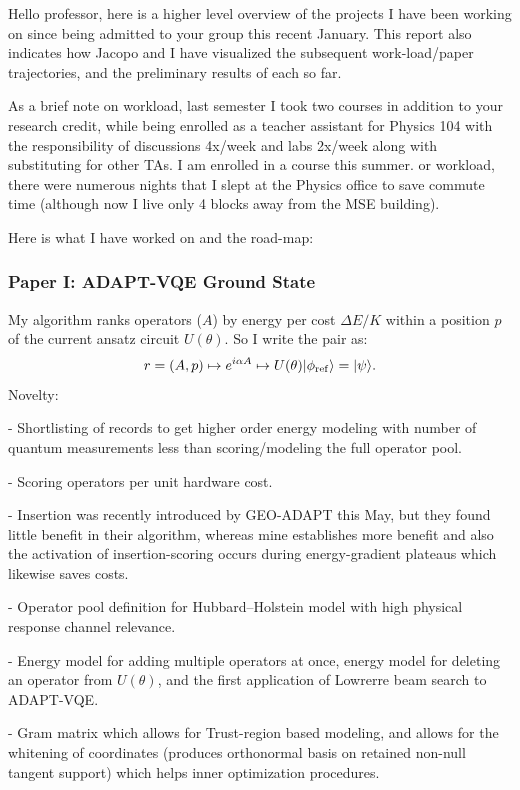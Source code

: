 \documentclass[11pt]{article}
\begin{document}
Hello professor, here is a higher level overview of the projects I have been working on since being admitted to your group this recent January. This report also indicates how Jacopo and I have visualized the subsequent work-load/paper trajectories, and the preliminary results of each so far.

As a brief note on workload, last semester I took two courses in addition to your research credit, while being enrolled as a teacher assistant for Physics 104 with the responsibility of discussions 4x/week and labs 2x/week along with substituting for other TAs. I am enrolled in a course this summer.
or workload, there were numerous nights that I slept at the Physics office to save commute time (although now I live only 4 blocks away from the MSE building).

Here is what I have worked on and the road-map:

\subsubsection*{Paper I: ADAPT-VQE Ground State}
My algorithm ranks operators ($A$) by energy per cost $\Delta E / K$ within a position $p$ of the current ansatz circuit $U(\theta)$. So I write the pair as:
\[
r=(A,p) \mapsto e^{i\alpha A} \mapsto U(\theta)| \phi_{\rm ref} \rangle=|\psi\rangle.
\]
Novelty:

- Shortlisting of records to get higher order energy modeling with number of quantum measurements less than scoring/modeling the full operator pool.

- Scoring operators per unit hardware cost.

- Insertion was recently introduced by GEO-ADAPT this May, but they found little benefit in their algorithm, whereas mine establishes more benefit and also the activation of insertion-scoring occurs during energy-gradient plateaus which likewise saves costs.

- Operator pool definition for Hubbard--Holstein model with high physical response channel relevance.

- Energy model for adding multiple operators at once, energy model for deleting an operator from $U(\theta)$, and the first application of Lowrerre beam search to ADAPT-VQE.

- Gram matrix which allows for Trust-region based modeling, and allows for the whitening of coordinates (produces orthonormal basis on retained non-null tangent support) which helps inner optimization procedures.
\end{document}
